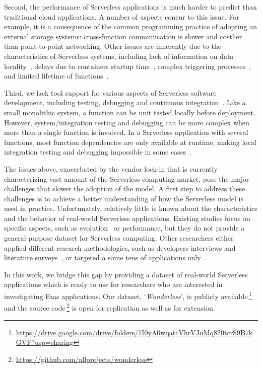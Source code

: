 Second, the performance of Serverless applications is much harder to 
predict than traditional cloud applications. A number of aspects concur 
to this issue.
For example, it is a consequence of the common programming practice
of adopting an external storage systems: cross-function communication 
is slower and costlier than point-to-point networking.
Other issues are inherently due to the characteristics of Serverless systems,
including lack of information on data locality~\cite{DBLP:journals/corr/abs-1902-03383},
delays due to containers startup time~\cite{manner2018cold}, 
complex triggering processes~\cite{pelle2019towards}, and
limited lifetime of functions~\cite{hellerstein2018serverless}.

Third, we lack tool support for various aspects of
Serverless software development, including testing, debugging 
and continuous integration~\cite{lenarduzzi2020serverless,nupponen2020serverless}.
Like a small monolithic system, a function can be unit tested 
locally before deployment. 
However, system/integration testing and debugging can 
be more complex when more than a single function is involved. 
In a Serverless application with several functions, 
most function
dependencies are only available at runtime, 
making local integration testing and debugging impossible in 
some cases~\cite{leitner2019mixed}.


The issues above, exacerbated by the vendor lock-in that is currently 
characterizing vast amount of the Serverless computing market, 
pose the major challenges that slower the adoption of the \faas model. 
A first step to address these challenges is to achieve a 
better understanding of how the Serverless model is used in practice. 
Unfortunately, relatively little is known about the characteristics 
and the behavior of real-world Serverless applications. Existing studies focus 
on specific aspects, such as evolution~\cite{spillner2019quantitative} 
or performance\cite{wang2018peeking,lloyd2018serverless},
but they do not provide a general-purpose dataset for Serverless computing.
Other researchers either applied different research methodologies, 
such as developers interviews and literature surveys~\cite{leitner2019mixed},
or targeted a some tens of applications only~\cite{eismann2020serverless}.


In this work, we bridge this gap by providing a dataset of real-world Serverless 
applications which is ready to use for researchers who are interested in investigating
Faas applications. Our dataset, `\emph{Wonderless}', is publicly 
available\,\footnote{\url{https://drive.google.com/drive/folders/1I0yA0wqatcVhrVJuMq820tcrS9B7kGVF?usp=sharing}} 
and the source code\,\footnote{\url{https://github.com/allprojects/wonderless}} 
is open for replication as well as for extension.











